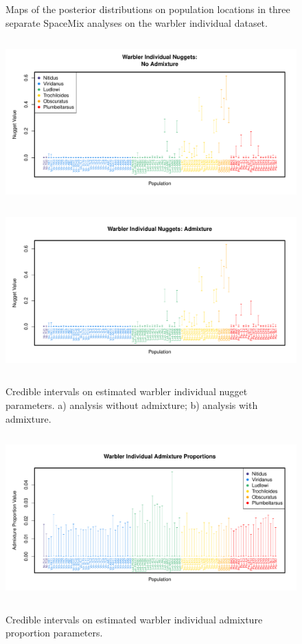 \documentclass[12pt]{article}
\begin{document}
\begin{figure}
	\caption{Maps of the posterior distributions on population locations in three separate SpaceMix analyses on the warbler individual dataset.}\label{sfig:warb_ind_clouds}
\end{figure}

\begin{figure}
\centering
	\subcaptionbox{\label{warb_ind_noad_nugg}}
		{\includegraphics[width=5in,height=2.5in]{figs/warblers/warb_ind_NoAd_nugget.pdf}}
	\subcaptionbox{\label{warb_ind_ad_nugg}}
		{\includegraphics[width=5in,height=2.5in]{figs/warblers/warb_ind_Ad_nugget.pdf}}
	\caption{Credible intervals on estimated warbler individual nugget parameters.  a) analysis without admixture; b) analysis with admixture.}\label{sfig:warb_ind_noad_nugg}
\end{figure}

\begin{figure}
\centering
	{\includegraphics[width=5in,height=2.5in]{figs/warblers/warb_ind_adprop.pdf}}
	\caption{Credible intervals on estimated warbler individual admixture proportion parameters.}\label{sfig:warb_ind_adprops}
\end{figure}
\end{document}
